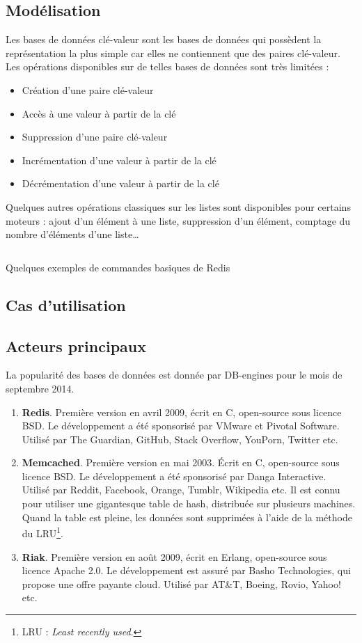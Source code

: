 \subsection{Modélisation}
	Les bases de données clé-valeur sont les bases de données qui possèdent la représentation la plus simple car elles ne contiennent que des paires clé-valeur. Les opérations disponibles sur de telles bases de données sont très limitées :
	\begin{itemize}
		\item Création d'une paire clé-valeur 
		\item Accès à une valeur à partir de la clé
		\item Suppression d'une paire clé-valeur
		\item Incrémentation d'une valeur à partir de la clé
		\item Décrémentation d'une valeur à partir de la clé
	\end{itemize}
	\vspace{20px}
	Quelques autres opérations classiques sur les listes sont disponibles pour certains moteurs : ajout d'un élément à une liste, suppression d'un élément, comptage du nombre d'éléments d'une liste\dots

	\begin{listing}[H]
		\inputminted{text}{code/commandesRedis.txt}
		\caption{Quelques exemples de commandes basiques de Redis}
	\end{listing}

\subsection{Cas d'utilisation}

\subsection{Acteurs principaux}
	La popularité des bases de données est donnée par DB-engines\cite{db_engines_key_value} pour le mois de septembre 2014.

	\begin{enumerate}
		\item \textbf{Redis}. Première version en avril 2009, écrit en C, open-source sous licence BSD. Le développement a été sponsorisé par VMware et Pivotal Software. Utilisé par The Guardian, GitHub, Stack Overflow, YouPorn, Twitter etc.\cite{Wikipedia_redis}
		\item \textbf{Memcached}. Première version en mai 2003. Écrit en C, open-source sous licence BSD. Le développement a été sponsorisé par Danga Interactive. Utilisé par Reddit, Facebook, Orange, Tumblr, Wikipedia etc. Il est connu pour utiliser une gigantesque table de hash, distribuée sur plusieurs machines. Quand la table est pleine, les données sont supprimées à l'aide de la méthode du LRU\footnote{LRU : \textit{Least recently used}.}.\cite{Wikipedia_memcached}
		\item \textbf{Riak}. Première version en août 2009, écrit en Erlang, open-source sous licence Apache 2.0. Le développement est assuré par Basho Technologies, qui propose une offre payante cloud. Utilisé par AT\&T, Boeing, Rovio, Yahoo! etc.\cite{Wikipedia_riak}
	\end{enumerate}
